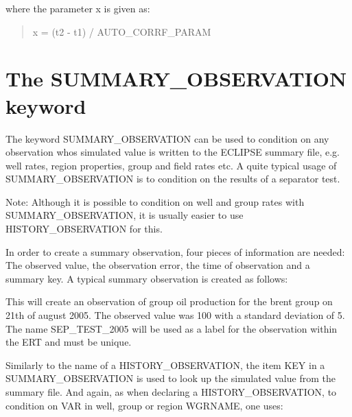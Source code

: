\documentclass[letterpaper,10pt,english]{sphinxmanual}
\begin{document}
where the parameter x is given as:
\begin{quote}

x = (t2 - t1) / AUTO\_CORRF\_PARAM
\end{quote}


\section{The SUMMARY\_OBSERVATION keyword}
\label{\detokenize{observations/index:the-summary-observation-keyword}}
The keyword SUMMARY\_OBSERVATION can be used to condition on any
observation whos simulated value is written to the ECLIPSE summary
file, e.g. well rates, region properties, group and field rates etc. A
quite typical usage of SUMMARY\_OBSERVATION is to condition on the
results of a separator test.

Note: Although it is possible to condition on well and group rates
with SUMMARY\_OBSERVATION, it is usually easier to use
HISTORY\_OBSERVATION for this.

In order to create a summary observation, four pieces of information
are needed: The observed value, the observation error, the time of
observation and a summary key. A typical summary observation is
created as follows:

%
\begin{sphinxVerbatim}[commandchars=\\\{\}]
 
     
       
      
       
\end{sphinxVerbatim}

This will create an observation of group oil production for the brent
group on 21th of august 2005. The observed value was 100 with a
standard deviation of 5. The name SEP\_TEST\_2005 will be used as a
label for the observation within the ERT and must be unique.

Similarly to the name of a HISTORY\_OBSERVATION, the item KEY in a
SUMMARY\_OBSERVATION is used to look up the simulated value from the
summary file. And again, as when declaring a HISTORY\_OBSERVATION, to
condition on VAR in well, group or region WGRNAME, one uses:
\end{document}
